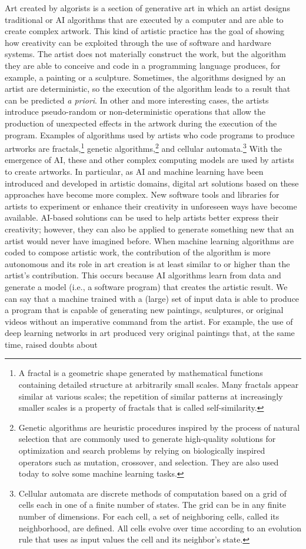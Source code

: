 Art created by algorists is a section of generative art in which an artist designs traditional or AI algorithms that are executed by a computer and are able to create complex artwork. This kind of artistic practice has the goal of showing how creativity can be exploited through the use of software and hardware systems. The artist does not materially construct the work, but the algorithm they are able to conceive and code in a programming language produces, for example, a painting or a sculpture. Sometimes, the algorithms designed by an artist are deterministic, so the execution of the algorithm leads to a result that can be predicted \textit{a priori}. In other and more interesting cases, the artists introduce pseudo-random or non-deterministic operations that allow the production of unexpected effects in the artwork during the execution of the program. Examples of algorithms used by artists who code programs to produce artworks are fractals,\footnote{A fractal is a geometric shape generated by mathematical functions containing detailed structure at arbitrarily small scales. Many fractals appear similar at various scales; the repetition of similar patterns at increasingly smaller scales is a property of fractals that is called self-similarity.} genetic algorithms,\footnote{Genetic algorithms are heuristic procedures inspired by the process of natural selection that are commonly used to generate high-quality solutions for optimization and search problems by relying on biologically inspired operators such as mutation, crossover, and selection. They are also used today to solve some machine learning tasks.} and cellular automata.\footnote{Cellular automata are discrete methods of computation based on a grid of cells each in one of a finite number of states. The grid can be in any finite number of dimensions. For each cell, a set of neighboring cells, called its neighborhood, are defined. All cells evolve over time according to an evolution rule that uses as input values the cell and its neighbor's state.} With the emergence of AI, these and other complex computing models are used by artists to create artworks. In particular, as AI and machine learning have been introduced and developed in artistic domains, digital art solutions based on these approaches have become more complex. New software tools and libraries for artists to experiment or enhance their creativity in unforeseen ways have become available. AI-based solutions can be used to help artists better express their creativity; however, they can also be applied to generate something new that an artist would never have imagined before. When machine learning algorithms are coded to compose artistic work, the contribution of the algorithm is more autonomous and its role in art creation is at least similar to or higher than the artist's contribution. This occurs because AI algorithms learn from data and generate a model (i.e., a software program) that creates the artistic result. We can say that a machine trained with a (large) set of input data is able to produce a program that is capable of generating new paintings, sculptures, or original videos without an imperative command from the artist. For example, the use of deep learning networks in art produced very original paintings that, at the same time, raised doubts about 